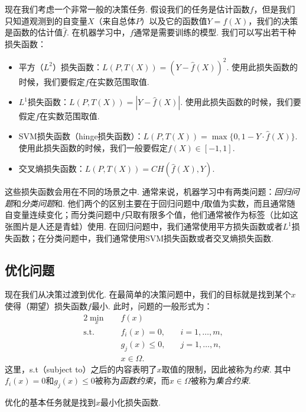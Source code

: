 现在我们考虑一个非常一般的决策任务. 假设我们的任务是估计函数$f$，但是我们只知道观测到的自变量$X$（来自总体$P$）以及它的函数值$Y=f(X)$，我们的决策是函数的估计值$\hat f$. 在机器学习中，$f$通常是需要训练的模型. 我们可以写出若干种损失函数：
\begin{itemize}
    \item 平方（$L^2$）损失函数：$L(P,T(X))=(Y-\hat f(X))^2$. 使用此损失函数的时候，我们要假定$f$在实数范围取值. 
    \item $L^1$损失函数：$L(P,T(X))=|Y-\hat f(X)|$. 使用此损失函数的时候，我们要假定$f$在实数范围取值. 
    \item SVM损失函数（hinge损失函数）：$L(P,T(X))=\max\{0,1-Y\cdot\hat f(X)\}$. 使用此损失函数的时候，我们一般要假定$f(X)\in[-1,1]$. 
    \item 交叉熵损失函数：$L(P,T(X))=CH(\hat f(X),Y)$.
\end{itemize}

这些损失函数会用在不同的场景之中. 通常来说，机器学习中有两类问题：\emph{回归问题}和\emph{分类问题}和. 他们两个的区别主要在于回归问题中$f$取值为实数，而且通常随自变量连续变化；而分类问题中$f$只取有限多个值，他们通常被作为标签（比如这张图片是人还是青蛙）使用. 在回归问题中，我们通常使用平方损失函数或者$L^1$损失函数；在分类问题中，我们通常使用SVM损失函数或者交叉熵损失函数. 

\subsection{优化问题}
现在我们从决策过渡到优化. 在最简单的决策问题中，我们的目标就是找到某个$x$使得（期望）损失函数$f$最小. 此时，问题的一般形式为：
\begin{alignat*}{2}
\min_{x}&\quad f(x)\\
\text{s.t.}&\quad f_i(x)=0,&\quad i=1,\dots,m,\\
&\quad g_j(x)\leq 0,&\quad j=1,\dots,n,\\
&\quad x\in\Omega.
\end{alignat*}
这里，s.t（subject to）之后的内容表明了$x$取值的限制，因此被称为\emph{约束}. 其中$f_i(x)=0$和$g_j(x)\leq 0$被称为\emph{函数约束}，而$x\in\Omega$被称为\emph{集合约束}.

优化的基本任务就是找到$x$最小化损失函数. 

